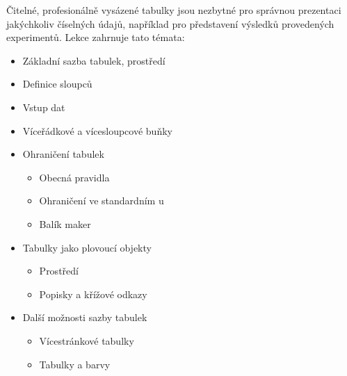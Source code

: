 {
	Čitelné, profesionálně vysázené tabulky jsou nezbytné pro správnou prezentaci jakýchkoliv číselných údajů, například pro představení výsledků provedených experimentů. Lekce zahrnuje tato témata:
	\begin{itemize}
		\item Základní sazba tabulek, prostředí 
		\item Definice sloupců
		\item Vstup dat
		\item Víceřádkové a vícesloupcové buňky
		\item Ohraničení tabulek
			\begin{itemize}
				\item Obecná pravidla
				\item Ohraničení ve standardním u
				\item Balík maker 
			\end{itemize}
		\item Tabulky jako plovoucí objekty
			\begin{itemize}
				\item Prostředí 
				\item Popisky a křížové odkazy
			\end{itemize}
		\item Další možnosti sazby tabulek
			\begin{itemize}
				\item Vícestránkové tabulky
				\item Tabulky a barvy
			\end{itemize}
	\end{itemize}
}
\endinput
